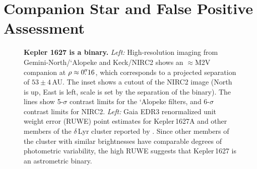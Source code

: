 \documentclass[12pt,modern,twocolumn,tighten]{aastex63}
\begin{document}
\section{Companion Star and False Positive Assessment}
\label{app:companionstar}

\begin{figure}[tp]
	\begin{center}
		\leavevmode
	\end{center}
	\vspace{-0.7cm}
	\caption{
    {\bf Kepler 1627 is a binary.} {\it Left:} High-resolution imaging
    from Gemini-North/`Alopeke and Keck/NIRC2 shows an $\approx$M2V
    companion at $\rho \approx 0\mbox{$.\!\!^{\prime\prime}$}16$, which corresponds to a
    projected separation of $53\pm4$\,AU.  The inset shows a cutout of
    the NIRC2 image (North is up, East is left, scale is set by the
    separation of the binary).  The lines show 5-$\sigma$ contrast
    limits for the `Alopeke filters, and 6-$\sigma$ contrast limits
    for NIRC2.  {\it Left:} Gaia EDR3 renormalized
    unit weight error (RUWE) point estimates for Kepler\,1627A and
    other members of the $\delta$\,Lyr cluster reported by
    \citet{KounkelCovey2019}.  Since other members of the cluster with
    similar brightnesses have comparable degrees of photometric
    variability, the high RUWE suggests that Kepler\,1627 is an
    astrometric binary. 
    \label{fig:kep1627binary}
	}
\end{figure}
\end{document}
